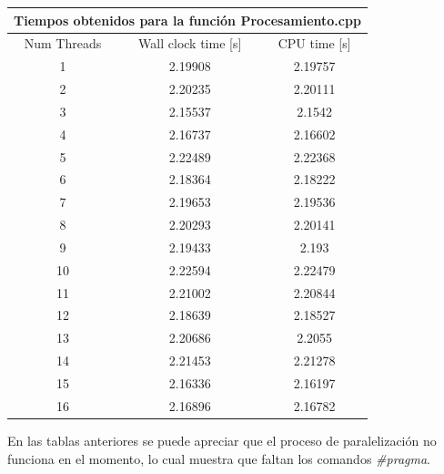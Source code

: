 \documentclass[article,latterpaper]{article}
\begin{document}
\begin{center}
  \begin{tabular}{|c|c|c|}
    \hline
    \multicolumn{3}{|c|}{Tiempos obtenidos para la función Procesamiento.cpp} \\
    \hline
    Num Threads & Wall clock time [s] & CPU time [s] \\
    \hline
    1 & 2.19908 & 2.19757 \\
    \hline
    2 & 2.20235 & 2.20111 \\
    \hline
    3 & 2.15537 & 2.1542 \\
    \hline
    4 & 2.16737 & 2.16602 \\
    \hline
    5 & 2.22489 & 2.22368 \\
    \hline
    6 & 2.18364 & 2.18222 \\
    \hline
    7 & 2.19653 & 2.19536 \\
    \hline
    8 & 2.20293 & 2.20141 \\
    \hline
    9 & 2.19433 & 2.193 \\
    \hline
    10 & 2.22594 & 2.22479 \\
    \hline
    11 & 2.21002 & 2.20844 \\
    \hline
    12 & 2.18639 & 2.18527 \\
    \hline
    13 & 2.20686 & 2.2055 \\
    \hline
    14 & 2.21453 & 2.21278 \\
    \hline
    15 & 2.16336 & 2.16197 \\
    \hline
    16 & 2.16896 & 2.16782 \\
    \hline
  \end{tabular}
\end{center}
  
En las tablas anteriores se puede apreciar que el proceso de paralelización no funciona en el momento, lo cual muestra que faltan los comandos \textit{\#pragma}.

\newpage
\end{document}

